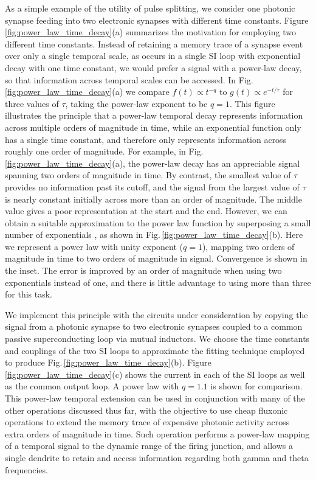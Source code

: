 \documentclass[twocolumn]{article}
\begin{document}
As a simple example of the utility of pulse splitting, we consider one photonic synapse feeding into two electronic synapses with different time constants. Figure \ref{fig:power_law_time_decay}(a) summarizes the motivation for employing two different time constants. Instead of retaining a memory trace of a synapse event over only a single temporal scale, as occurs in a single SI loop with exponential decay with one time constant, we would prefer a signal with a power-law decay, so that information across temporal scales can be accessed. In Fig.\,\ref{fig:power_law_time_decay}(a) we compare $f(t) \propto t^{-q}$ to $g(t) \propto e^{-t/\tau}$ for three values of $\tau$, taking the power-law exponent to be $q=1$. This figure illustrates the principle that a power-law temporal decay represents information across multiple orders of magnitude in time, while an exponential function only has a single time constant, and therefore only represents information across roughly one order of magnitude. For example, in Fig.\,\ref{fig:power_law_time_decay}(a), the power-law decay has an appreciable signal spanning two orders of magnitude in time. By contrast, the smallest value of $\tau$ provides no information past its cutoff, and the signal from the largest value of $\tau$ is nearly constant initially across more than an order of magnitude. The middle value gives a poor representation at the start and the end. However, we can obtain a suitable approximation to the power law function by superposing a small number of exponentials \cite{be2007}, as shown in Fig.\,\ref{fig:power_law_time_decay}(b). Here we represent a power law with unity exponent ($q=1$), mapping two orders of magnitude in time to two orders of magnitude in signal. Convergence is shown in the inset. The error is improved by an order of magnitude when using two exponentials instead of one, and there is little advantage to using more than three for this task. 

We implement this principle with the circuits under consideration by copying the signal from a photonic synapse to two electronic synapses coupled to a common passive superconducting loop via mutual inductors. We choose the time constants and couplings of the two SI loops to approximate the fitting technique employed to produce Fig.\,\ref{fig:power_law_time_decay}(b). Figure \ref{fig:power_law_time_decay}(c) shows the current in each of the SI loops as well as the common output loop. A power law with $q = 1.1$ is shown for comparison. This power-law temporal extension can be used in conjunction with many of the other operations discussed thus far, with the objective to use cheap fluxonic operations to extend the memory trace of expensive photonic activity across extra orders of magnitude in time. Such operation performs a power-law mapping of a temporal signal to the dynamic range of the firing junction, and allows a single dendrite to retain and access information regarding both gamma and theta frequencies. 
\end{document}
